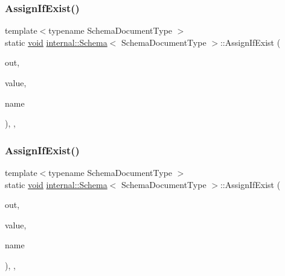 \mbox{\label{classinternal_1_1Schema_a46ccbd17094962256ae9ea12c31f4f92}} 
\subsubsection{\texorpdfstring{Assign\+If\+Exist()}{AssignIfExist()}\hspace{0.1cm}{\footnotesize\ttfamily [1/3]}}
{\footnotesize\ttfamily template$<$typename Schema\+Document\+Type $>$ \\
static \hyperlink{imgui__impl__opengl3__loader_8h_ac668e7cffd9e2e9cfee428b9b2f34fa7}{void} \hyperlink{classinternal_1_1Schema}{internal\+::\+Schema}$<$ Schema\+Document\+Type $>$\+::Assign\+If\+Exist (\begin{DoxyParamCaption}\item[{bool \&}]{out,  }\item[{const \hyperlink{classinternal_1_1Schema_a8976b6d7e2a885483d0b51d941019340}{Value\+Type} \&}]{value,  }\item[{const \hyperlink{classinternal_1_1Schema_a8976b6d7e2a885483d0b51d941019340}{Value\+Type} \&}]{name }\end{DoxyParamCaption})\hspace{0.3cm}{\ttfamily [inline]}, {\ttfamily [static]}, {\ttfamily [private]}}

\mbox{\label{classinternal_1_1Schema_a2dd176fa402942fd45301efcc6bb0e3f}} 
\subsubsection{\texorpdfstring{Assign\+If\+Exist()}{AssignIfExist()}\hspace{0.1cm}{\footnotesize\ttfamily [2/3]}}
{\footnotesize\ttfamily template$<$typename Schema\+Document\+Type $>$ \\
static \hyperlink{imgui__impl__opengl3__loader_8h_ac668e7cffd9e2e9cfee428b9b2f34fa7}{void} \hyperlink{classinternal_1_1Schema}{internal\+::\+Schema}$<$ Schema\+Document\+Type $>$\+::Assign\+If\+Exist (\begin{DoxyParamCaption}\item[{\hyperlink{rapidjson_8h_a5ed6e6e67250fadbd041127e6386dcb5}{Size\+Type} \&}]{out,  }\item[{const \hyperlink{classinternal_1_1Schema_a8976b6d7e2a885483d0b51d941019340}{Value\+Type} \&}]{value,  }\item[{const \hyperlink{classinternal_1_1Schema_a8976b6d7e2a885483d0b51d941019340}{Value\+Type} \&}]{name }\end{DoxyParamCaption})\hspace{0.3cm}{\ttfamily [inline]}, {\ttfamily [static]}, {\ttfamily [private]}}

